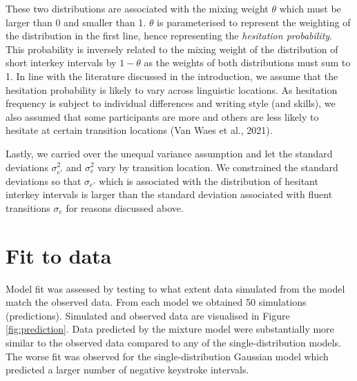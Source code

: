 \documentclass[
  man,floatsintext]{apa7}
\begin{document}
These two distributions are associated with the mixing weight \(\theta\) which must be larger than 0 and smaller than 1. \(\theta\) is parameterised to represent the weighting of the distribution in the first line, hence representing the \emph{hesitation probability}. This probability is inversely related to the mixing weight of the distribution of short interkey intervals by \(1-\theta\) as the weights of both distributions must sum to 1. In line with the literature discussed in the introduction, we assume that the hesitation probability is likely to vary across linguistic locations. As hesitation frequency is subject to individual differences and writing style (and skills), we also assumed that some participants are more and others are less likely to hesitate at certain transition locations (Van Waes et al., 2021).

Lastly, we carried over the unequal variance assumption and let the standard deviations \(\sigma_{e'}^2\) and \(\sigma_{e}^2\) vary by transition location. We constrained the standard deviations so that \(\sigma_{e'}\) which is associated with the distribution of hesitant interkey intervals is larger than the standard deviation associated with fluent transitions \(\sigma_e\) for reasons discussed above.

\newpage

\hypertarget{fit-to-data}{%
\section{Fit to data}\label{fit-to-data}}

Model fit was assessed by testing to what extent data simulated from the model match the observed data. From each model we obtained 50 simulations (predictions). Simulated and observed data are visualised in Figure \ref{fig:prediction}. Data predicted by the mixture model were substantially more similar to the observed data compared to any of the single-distribution models. The worse fit was observed for the single-distribution Gaussian model which predicted a larger number of negative keystroke intervals.
\end{document}
